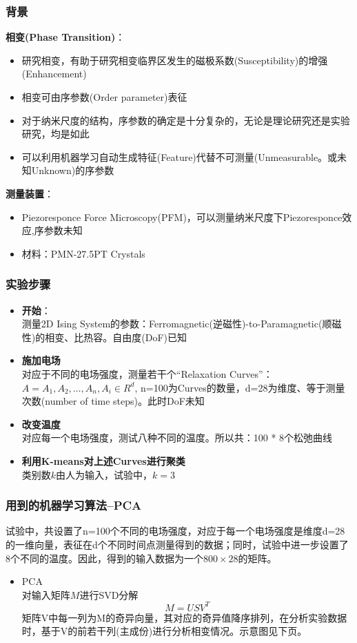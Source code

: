 \documentclass{beamer}
\begin{document}
\begin{frame}
\frametitle{背景}
\textbf{相变(Phase Transition)}：
\begin{itemize}
\item 研究相变，有助于研究相变临界区发生的磁极系数(Susceptibility)的增强(Enhancement)
\item 相变可由序参数(Order parameter)表征
\item 对于纳米尺度的结构，序参数的确定是十分复杂的，无论是理论研究还是实验研究，均是如此
\item 可以利用机器学习自动生成特征(Feature)代替不可测量(Unmeasurable。或未知Unknown)的序参数
\end{itemize}
\textbf{测量装置}：
\begin{itemize}
\item Piezoresponce Force Microscopy(PFM)，可以测量纳米尺度下Piezoresponce效应,序参数未知
\item 材料：PMN-27.5PT Crystals
\end{itemize}
\end{frame}

\begin{frame}
\frametitle{实验步骤}
\begin{itemize}
\item \textbf{开始}：\\
测量2D Ising System的参数：Ferromagnetic(逆磁性)-to-Paramagnetic(顺磁性)的相变、比热容。自由度(DoF)已知
\item \textbf{施加电场}\\
对应于不同的电场强度，测量若干个“Relaxation Curves”：$A = {A_1, A_2, \ldots, A_n}, A_i \in R^d$, n=100为Curves的数量，d=28为维度、等于测量次数(number of time steps)。此时DoF未知
\item \textbf{改变温度}\\
对应每一个电场强度，测试八种不同的温度。所以共：100 * 8个松弛曲线
\item \textbf{利用K-means对上述Curves进行聚类} \\
类别数$k$由人为输入，试验中，$k=3$
\end{itemize}
\end{frame}


\begin{frame}
\frametitle{用到的机器学习算法--PCA}
试验中，共设置了n=100个不同的电场强度，对应于每一个电场强度是维度d=28的一维向量，表征在d个不同时间点测量得到的数据；同时，试验中进一步设置了8个不同的温度。因此，得到的输入数据为一个$800 \times 28$的矩阵。

\begin{itemize}
\item PCA \\
对输入矩阵$M$进行SVD分解
\begin{displaymath}
M = USV^T
\end{displaymath}
矩阵V中每一列为M的奇异向量，其对应的奇异值降序排列，在分析实验数据时，基于V的前若干列(主成份)进行分析相变情况。示意图见下页。
\end{itemize}
\end{frame}
\end{document}
